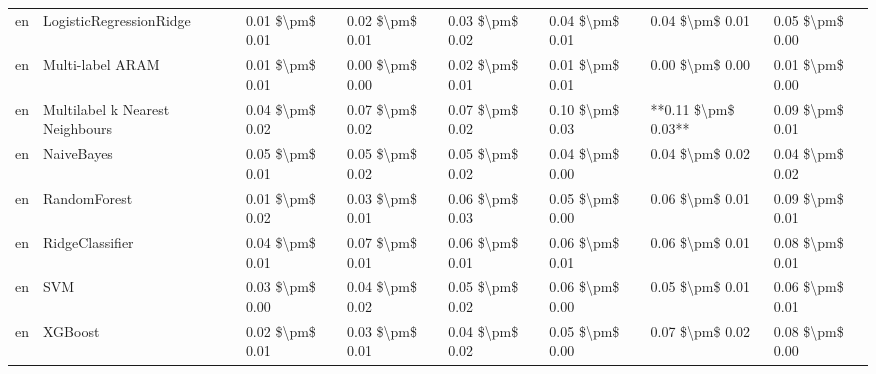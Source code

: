 \begin{tabular}{llllllll}
      en &         LogisticRegressionRidge & 0.01 \$\textbackslash pm\$ 0.01 &           0.02 \$\textbackslash pm\$ 0.01 &       0.03 \$\textbackslash pm\$ 0.02 &        0.04 \$\textbackslash pm\$ 0.01 &                         0.04 \$\textbackslash pm\$ 0.01 &     0.05 \$\textbackslash pm\$ 0.00 \\
      en &                Multi-label ARAM & 0.01 \$\textbackslash pm\$ 0.01 &           0.00 \$\textbackslash pm\$ 0.00 &       0.02 \$\textbackslash pm\$ 0.01 &        0.01 \$\textbackslash pm\$ 0.01 &                         0.00 \$\textbackslash pm\$ 0.00 &     0.01 \$\textbackslash pm\$ 0.00 \\
      en & Multilabel k Nearest Neighbours & 0.04 \$\textbackslash pm\$ 0.02 &           0.07 \$\textbackslash pm\$ 0.02 &       0.07 \$\textbackslash pm\$ 0.02 &        0.10 \$\textbackslash pm\$ 0.03 &                     **0.11 \$\textbackslash pm\$ 0.03** &     0.09 \$\textbackslash pm\$ 0.01 \\
      en &                      NaiveBayes & 0.05 \$\textbackslash pm\$ 0.01 &           0.05 \$\textbackslash pm\$ 0.02 &       0.05 \$\textbackslash pm\$ 0.02 &        0.04 \$\textbackslash pm\$ 0.00 &                         0.04 \$\textbackslash pm\$ 0.02 &     0.04 \$\textbackslash pm\$ 0.02 \\
      en &                    RandomForest & 0.01 \$\textbackslash pm\$ 0.02 &           0.03 \$\textbackslash pm\$ 0.01 &       0.06 \$\textbackslash pm\$ 0.03 &        0.05 \$\textbackslash pm\$ 0.00 &                         0.06 \$\textbackslash pm\$ 0.01 &     0.09 \$\textbackslash pm\$ 0.01 \\
      en &                 RidgeClassifier & 0.04 \$\textbackslash pm\$ 0.01 &           0.07 \$\textbackslash pm\$ 0.01 &       0.06 \$\textbackslash pm\$ 0.01 &        0.06 \$\textbackslash pm\$ 0.01 &                         0.06 \$\textbackslash pm\$ 0.01 &     0.08 \$\textbackslash pm\$ 0.01 \\
      en &                             SVM & 0.03 \$\textbackslash pm\$ 0.00 &           0.04 \$\textbackslash pm\$ 0.02 &       0.05 \$\textbackslash pm\$ 0.02 &        0.06 \$\textbackslash pm\$ 0.00 &                         0.05 \$\textbackslash pm\$ 0.01 &     0.06 \$\textbackslash pm\$ 0.01 \\
      en &                         XGBoost & 0.02 \$\textbackslash pm\$ 0.01 &           0.03 \$\textbackslash pm\$ 0.01 &       0.04 \$\textbackslash pm\$ 0.02 &        0.05 \$\textbackslash pm\$ 0.00 &                         0.07 \$\textbackslash pm\$ 0.02 &     0.08 \$\textbackslash pm\$ 0.00 \\

\end{tabular}
